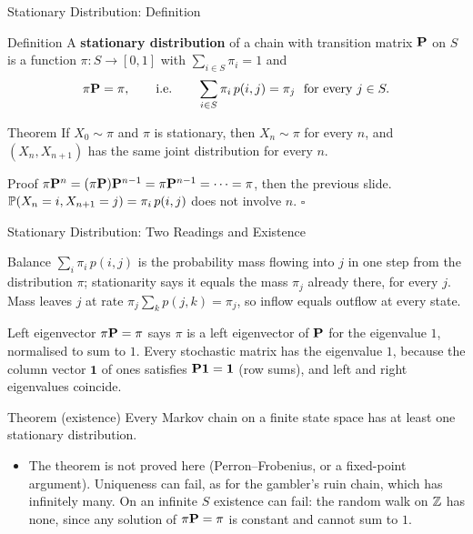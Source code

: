 \begin{frame}{Stationary Distribution: Definition}
  \label{fr:statdef}
  \small
  \begin{block}{Definition}
    A \textbf{stationary distribution} of a chain with transition matrix $\mathbf{P}$ on $S$ is a function $\pi\colon S\to[0,1]$ with $\sum_{i\in S}\pi_i=1$ and
    \[
      \pi\mathbf{P}=\pi,\qquad\text{i.e.}\qquad \sum_{i\in S}\pi_i\,p(i,j)=\pi_j\ \text{ for every } j\in S .
    \]
  \end{block}
  \begin{block}{Theorem}
    If $X_0\sim\pi$ and $\pi$ is stationary, then $X_n\sim\pi$ for every $n$, and $(X_n,X_{n+1})$ has the same joint distribution for every $n$.
  \end{block}
  \begin{block}{Proof}
    $\pi\mathbf{P}^n=(\pi\mathbf{P})\mathbf{P}^{n-1}=\pi\mathbf{P}^{n-1}=\dots=\pi$, then the previous slide. $\mathbb{P}(X_n=i,X_{n+1}=j)=\pi_i\,p(i,j)$ does not involve $n$. \hfill$\square$
  \end{block}
\end{frame}

\begin{frame}{Stationary Distribution: Two Readings and Existence}
  \label{fr:statexist}
  \small
  \begin{block}{Balance}
    $\sum_i\pi_i\,p(i,j)$ is the probability mass flowing into $j$ in one step from the distribution $\pi$; stationarity says it equals the mass $\pi_j$ already there, for every $j$. Mass leaves $j$ at rate $\pi_j\sum_{k}p(j,k)=\pi_j$, so inflow equals outflow at every state.
  \end{block}
  \begin{block}{Left eigenvector}
    $\pi\mathbf{P}=\pi$ says $\pi$ is a left eigenvector of $\mathbf{P}$ for the eigenvalue $1$, normalised to sum to $1$. Every stochastic matrix has the eigenvalue $1$, because the column vector $\mathbf 1$ of ones satisfies $\mathbf{P}\mathbf 1=\mathbf 1$ (row sums), and left and right eigenvalues coincide.
  \end{block}
  \begin{block}{Theorem (existence)}
    Every Markov chain on a finite state space has at least one stationary distribution.
  \end{block}
  \begin{itemize}
    \item The theorem is not proved here (Perron--Frobenius, or a fixed-point argument). Uniqueness can fail, as for the gambler's ruin chain, which has infinitely many. On an infinite $S$ existence can fail: the random walk on $\mathbb{Z}$ has none, since any solution of $\pi\mathbf{P}=\pi$ is constant and cannot sum to $1$.
  \end{itemize}
\end{frame}

